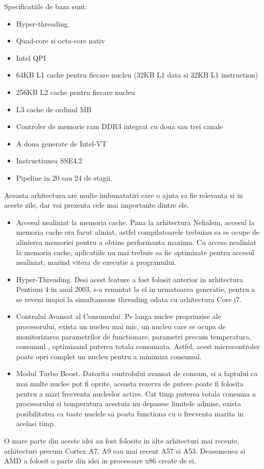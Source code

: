 Specificatiile de baza sunt:
\begin{itemize}

\item Hyper-threading.
\item Quad-core si octa-core nativ
\item Intel QPI
\item 64KB L1 cache pentru fiecare nucleu (32KB L1 data si 32KB L1 instruction)
\item 256KB L2 cache pentru fiecare nucleu
\item L3 cache de ordinul MB
\item Controler de memorie ram DDR3 integrat cu doua sau trei canale
\item A doua generate de Intel-VT
\item Instructiunea SSE4.2
\item Pipeline in 20 sau 24 de stagii.
     
      

\end{itemize}


Aceasta arhitectura are multe imbunatatiri care o ajuta sa fie relevanta si in aceste zile, dar
voi prezenta cele mai importante dintre ele.

\begin{itemize}

\item Accesul nealiniat la memoria cache. Pana la arhitectura Nehalem, accesul la memoria cache era
facut aliniat, astfel compilatoarele trebuiau sa se ocupe de alinierea memoriei pentru a obtine performanta
maxima. Cu access nealiniat la memoria cache, aplicatiile nu mai trebuie sa fie optimizate pentru
accesul nealiniat, marind viteza de executie a programului\cite{singhal2008inside}.

\item Hyper-Threading. Desi acest feature a fost folosit anterior in arhitectura Pentium 4 in anul
2003, s-a renuntat la el in urmatoarea generatie, pentru a se reveni inapoi la simultaneous threading odata cu arhitectura Core i7. 

\item Controlul Avansat al Consumului. Pe langa nuclee propriuzise ale procesorului, exista un
nucleu mai mic, un nucleu care se ocupa de monitorizarea parametrilor de functionare, parametri
precum temperatura, consumul , optimizand puterea totala consumata. Astfel, acest microcontroler
poate opri complet un nucleu pentru a minimiza consumul.

\item Modul Turbo Boost. Datorita controlului avansat de consum, si a faptului ca mai multe nuclee pot fi
oprite, aceasta rezerva de putere poate fi folosita pentru a mari frecventa nucleelor active. Cat
timp puterea totala consuma a procesorului si temperatura acestuia nu depasesc limitele admise,
exista posibilitatea ca toate nuclele sa poata functiona cu o frecventa marita in acelasi timp.

\end{itemize}

O mare parte din aceste idei au fost folosite in alte
arhitecturi mai recente, arhitecturi  precum Cortex A7, A9 sau mai recent A57 si A53. Deasemenea si
AMD a folosit o parte din idei in procesoare x86 create de ei.




